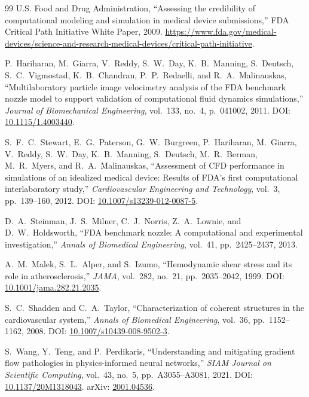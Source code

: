 \documentclass[12pt,a4paper]{article}
\begin{document}
\begin{thebibliography}{99}
U.S. Food and Drug Administration,
``Assessing the credibility of computational modeling and
simulation in medical device submissions,''
FDA Critical Path Initiative White Paper, 2009.
\url{https://www.fda.gov/medical-devices/science-and-research-medical-devices/critical-path-initiative}.

P.~Hariharan, M.~Giarra, V.~Reddy, S.~W.~Day,
K.~B.~Manning, S.~Deutsch, S.~C.~Vigmostad, K.~B.~Chandran,
P.~P.~Redaelli, and R.~A.~Malinauskas,
``Multilaboratory particle image velocimetry analysis of the
{FDA} benchmark nozzle model to support validation of
computational fluid dynamics simulations,''
\textit{Journal of Biomechanical Engineering}, vol.~133,
no.~4, p.~041002, 2011.
DOI: \href{https://doi.org/10.1115/1.4003440}{10.1115/1.4003440}.

S.~F.~C.~Stewart, E.~G.~Paterson, G.~W.~Burgreen,
P.~Hariharan, M.~Giarra, V.~Reddy, S.~W.~Day,
K.~B.~Manning, S.~Deutsch, M.~R.~Berman, M.~R.~Myers,
and R.~A.~Malinauskas,
``Assessment of {CFD} performance in simulations of an
idealized medical device: Results of {FDA}'s first
computational interlaboratory study,''
\textit{Cardiovascular Engineering and Technology}, vol.~3,
pp.~139--160, 2012.
DOI: \href{https://doi.org/10.1007/s13239-012-0087-5}{10.1007/s13239-012-0087-5}.

D.~A.~Steinman, J.~S.~Milner, C.~J.~Norris,
Z.~A.~Lownie, and D.~W.~Holdsworth,
``{FDA} benchmark nozzle: A computational and experimental
investigation,''
\textit{Annals of Biomedical Engineering}, vol.~41,
pp.~2425--2437, 2013.

A.~M.~Malek, S.~L.~Alper, and S.~Izumo,
``Hemodynamic shear stress and its role in atherosclerosis,''
\textit{JAMA}, vol.~282, no.~21, pp.~2035--2042, 1999.
DOI: \href{https://doi.org/10.1001/jama.282.21.2035}{10.1001/jama.282.21.2035}.

S.~C.~Shadden and C.~A.~Taylor,
``Characterization of coherent structures in the cardiovascular
system,''
\textit{Annals of Biomedical Engineering}, vol.~36,
pp.~1152--1162, 2008.
DOI: \href{https://doi.org/10.1007/s10439-008-9502-3}{10.1007/s10439-008-9502-3}.

S.~Wang, Y.~Teng, and P.~Perdikaris,
``Understanding and mitigating gradient flow pathologies in
physics-informed neural networks,''
\textit{SIAM Journal on Scientific Computing}, vol.~43,
no.~5, pp.~A3055--A3081, 2021.
DOI: \href{https://doi.org/10.1137/20M1318043}{10.1137/20M1318043}.
arXiv: \href{https://arxiv.org/abs/2001.04536}{2001.04536}.


\end{thebibliography}
\end{document}
